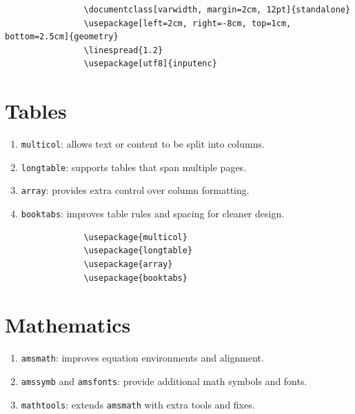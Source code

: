 \begin{minipage}{\anchoPag}
		\begin{mdframed}[style=code]
			\begin{verbatim}
				\documentclass[varwidth, margin=2cm, 12pt]{standalone}
				\usepackage[left=2cm, right=-8cm, top=1cm, bottom=2.5cm]{geometry}
				\linespread{1.2}
				\usepackage[utf8]{inputenc}
			\end{verbatim}
		\end{mdframed}

		
		\section{Tables}\label{sec:tables}
		
		\begin{enumerate}
			\item \texttt{multicol}: allows text or content to be split into columns.
			\item \texttt{longtable}: supports tables that span multiple pages.
			\item \texttt{array}: provides extra control over column formatting.
			\item \texttt{booktabs}: improves table rules and spacing for cleaner design.
		\end{enumerate}
		
		\begin{mdframed}[style=code]
			\begin{verbatim}
				\usepackage{multicol}
				\usepackage{longtable}
				\usepackage{array}
				\usepackage{booktabs}
			\end{verbatim}
		\end{mdframed}
		
		\section{Mathematics}\label{sec:math}
		
		\begin{enumerate}
			\item \texttt{amsmath}: improves equation environments and alignment.
			\item \texttt{amssymb} and \texttt{amsfonts}: provide additional math symbols and fonts.
			\item \texttt{mathtools}: extends \texttt{amsmath} with extra tools and fixes.
		\end{enumerate}
		

\end{minipage}

